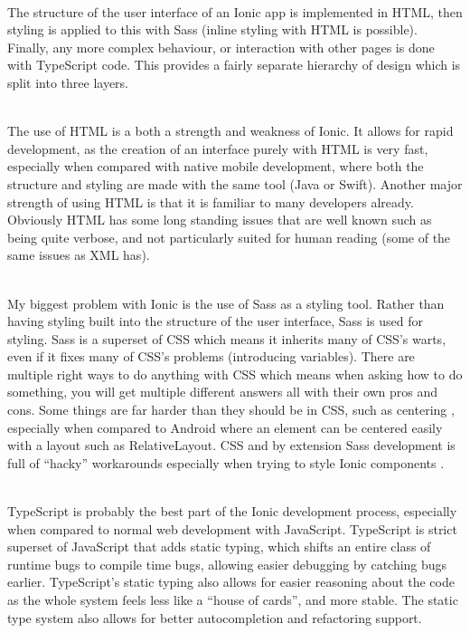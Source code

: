 \documentclass[a4paper, 11pt]{article}
\begin{document}
~\\
The structure of the user interface of an Ionic app is implemented in HTML, then styling is applied to this with Sass (inline styling with HTML is possible). Finally, any more complex behaviour, or interaction with other pages is done with TypeScript code. This provides a fairly separate hierarchy of design which is split into three layers. 

~\\
The use of HTML is a both a strength and weakness of Ionic. It allows for rapid development, as the creation of an interface purely with HTML is very fast, especially when compared with native mobile development, where both the structure and styling are made with the same tool (Java or Swift). Another major strength of using HTML is that it is familiar to many developers already.
Obviously HTML has some long standing issues that are well known such as being quite verbose, and not particularly suited for human reading (some of the same issues as XML has). 

~\\
My biggest problem with Ionic is the use of Sass as a styling tool. Rather than having styling built into the structure of the user interface, Sass is used for styling. Sass is a superset of CSS which means it inherits many of CSS's warts, even if it fixes many of CSS's problems (introducing variables). There are multiple right ways to do anything with CSS which means when asking how to do something, you will get multiple different answers all with their own pros and cons. Some things are far harder than they should be in CSS, such as centering \cite{cssCenter}, especially when compared to Android where an element can be centered easily with a layout such as RelativeLayout. CSS and by extension Sass development is full of “hacky” workarounds especially when trying to style Ionic components \cite{toastStyle}. 

~\\
TypeScript is probably the best part of the Ionic development process, especially when compared to normal web development with JavaScript. TypeScript is strict superset of JavaScript that adds static typing, which shifts an entire class of runtime bugs to compile time bugs, allowing easier debugging by catching bugs earlier. TypeScript’s static typing also allows for easier reasoning about the code as the whole system feels less like a “house of cards”, and more stable. The static type system also allows for better autocompletion and refactoring support.
\end{document}
